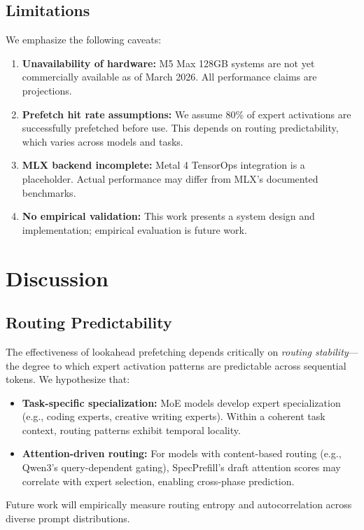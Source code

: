 \documentclass[11pt]{article}
\begin{document}
\subsection{Limitations}

We emphasize the following caveats:
\begin{enumerate}
    \item \textbf{Unavailability of hardware:} M5 Max 128GB systems are not yet commercially available as of March 2026. All performance claims are projections.
    \item \textbf{Prefetch hit rate assumptions:} We assume 80\% of expert activations are successfully prefetched before use. This depends on routing predictability, which varies across models and tasks.
    \item \textbf{MLX backend incomplete:} Metal 4 TensorOps integration is a placeholder. Actual performance may differ from MLX's documented benchmarks.
    \item \textbf{No empirical validation:} This work presents a system design and implementation; empirical evaluation is future work.
\end{enumerate}

\section{Discussion}

\subsection{Routing Predictability}

The effectiveness of lookahead prefetching depends critically on \textit{routing stability}—the degree to which expert activation patterns are predictable across sequential tokens. We hypothesize that:
\begin{itemize}
    \item \textbf{Task-specific specialization:} MoE models develop expert specialization (e.g., coding experts, creative writing experts). Within a coherent task context, routing patterns exhibit temporal locality.
    \item \textbf{Attention-driven routing:} For models with content-based routing (e.g., Qwen3's query-dependent gating), SpecPrefill's draft attention scores may correlate with expert selection, enabling cross-phase prediction.
\end{itemize}

Future work will empirically measure routing entropy and autocorrelation across diverse prompt distributions.
\end{document}
